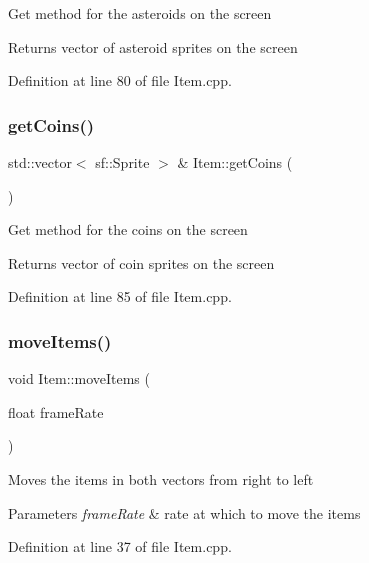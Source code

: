 Get method for the asteroids on the screen \begin{DoxyReturn}{Returns}
vector of asteroid sprites on the screen 
\end{DoxyReturn}


Definition at line 80 of file Item.\+cpp.

\mbox{\label{class_item_a272b51e3dad8000fe006b0aa5b4ec259}} 
\subsubsection{\texorpdfstring{getCoins()}{getCoins()}}
{\footnotesize\ttfamily std\+::vector$<$ sf\+::\+Sprite $>$ \& Item\+::get\+Coins (\begin{DoxyParamCaption}{ }\end{DoxyParamCaption})}

Get method for the coins on the screen \begin{DoxyReturn}{Returns}
vector of coin sprites on the screen 
\end{DoxyReturn}


Definition at line 85 of file Item.\+cpp.

\mbox{\label{class_item_ac28d0cbacc49ab30bdd0c593600a75be}} 
\subsubsection{\texorpdfstring{moveItems()}{moveItems()}}
{\footnotesize\ttfamily void Item\+::move\+Items (\begin{DoxyParamCaption}\item[{float}]{frame\+Rate }\end{DoxyParamCaption})}

Moves the items in both vectors from right to left 
\begin{DoxyParams}{Parameters}
{\em frame\+Rate} & rate at which to move the items \\
\hline
\end{DoxyParams}


Definition at line 37 of file Item.\+cpp.

\mbox{\label{class_item_acbef638becdf16de85c9602a93d47518}} 
